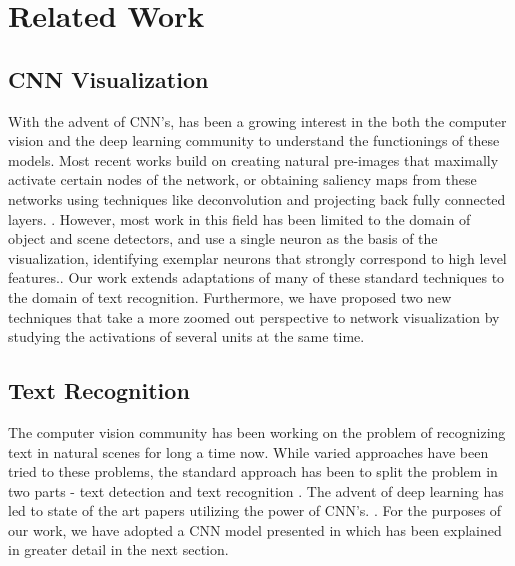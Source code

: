 \documentclass[10pt,twocolumn,letterpaper]{article}
\begin{document}
\section{Related Work}
\subsection{CNN Visualization}
With the advent of CNN's, has been a growing interest in the both the computer vision and the deep learning community to understand the functionings of these models. Most recent works build on creating natural pre-images \cite{DBLP:journals/corr/MahendranV15} that maximally activate certain nodes of the network, or obtaining saliency maps from these networks using techniques like deconvolution \cite{DBLP:journals/corr/ZeilerF13} and
projecting back fully connected layers. \cite{DBLP:journals/corr/SimonyanVZ13}. However, most work in this field has been limited to the domain of object and scene detectors, and use a single neuron as the basis of the visualization, identifying exemplar neurons that strongly correspond to high level features.\cite{zhou2014object,DBLP:journals/corr/GirshickDDM13,DBLP:journals/corr/MahendranV15,DBLP:journals/corr/ZeilerF13,DBLP:journals/corr/SimonyanVZ13,mahendran2015understanding}. Our work extends adaptations of many of these standard techniques \cite{yosinski2015understanding} to the domain of text recognition. Furthermore, we have proposed two new techniques that take a more zoomed out perspective to network visualization by studying the activations of several units at the same time. 

\subsection{Text Recognition}

The computer vision community has been working on the problem of recognizing text in natural scenes for long a time now\cite{1315187}. While varied approaches have been tried to these problems, the standard approach has been to split the problem in two parts - text detection and text recognition \cite{PosnerEtAl-IROS2010,Neumann:2011:TLR:2066306.2067476,Yang:2014:FIV:2583855.2583972,6751121,KaiWang:2011:EST:2355573.2356398,Weinman:2014:TIS:2574225.2574484,DBLP:journals/corr/AlsharifP13,6751207}. The advent of deep learning has led to state of the art papers utilizing the power of CNN's. \cite{Jaderberg14,Jaderberg14d,Gupta16,6460871}. For the purposes of our work, we have adopted a CNN model presented in \cite{Jaderberg14c} which has been explained in greater detail in the next section. 
\end{document}
